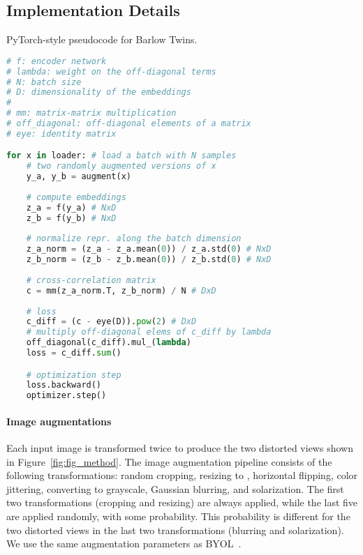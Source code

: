 \documentclass{article}
\begin{document}
\subsection{Implementation Details}
\label{sec:implementation_details}

\begin{algorithm}[tb]
   \caption{PyTorch-style pseudocode for Barlow Twins.}
   \label{alg:barlow_twins}
   
\begin{lstlisting}[language=python]
# f: encoder network
# lambda: weight on the off-diagonal terms
# N: batch size
# D: dimensionality of the embeddings
#
# mm: matrix-matrix multiplication
# off_diagonal: off-diagonal elements of a matrix
# eye: identity matrix

for x in loader: # load a batch with N samples
    # two randomly augmented versions of x
    y_a, y_b = augment(x)
    
    # compute embeddings
    z_a = f(y_a) # NxD
    z_b = f(y_b) # NxD
    
    # normalize repr. along the batch dimension
    z_a_norm = (z_a - z_a.mean(0)) / z_a.std(0) # NxD
    z_b_norm = (z_b - z_b.mean(0)) / z_b.std(0) # NxD
    
    # cross-correlation matrix
    c = mm(z_a_norm.T, z_b_norm) / N # DxD
    
    # loss
    c_diff = (c - eye(D)).pow(2) # DxD
    # multiply off-diagonal elems of c_diff by lambda
    off_diagonal(c_diff).mul_(lambda)
    loss = c_diff.sum()

    # optimization step
    loss.backward()
    optimizer.step()
\end{lstlisting}
\end{algorithm}



\paragraph{Image augmentations} Each input image is transformed twice to produce the two distorted views shown in Figure~\ref{fig:fig_method}. The image augmentation pipeline consists of the following transformations: random cropping, resizing to , horizontal flipping, color jittering, converting to grayscale, Gaussian blurring, and solarization. The first two transformations (cropping and resizing) are always applied, while the last five are applied randomly, with some probability. This probability is different for the two distorted views in the last two transformations (blurring and solarization). We use the same augmentation parameters as \textsc{BYOL}~\cite{grill2020bootstrap}.
\end{document}
